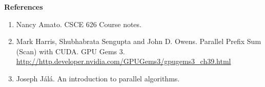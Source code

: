 \documentclass{article}
\theoremstyle{definition}
\begin{document}
\flushleft\textbf{References}
\begin{enumerate}
  \item Nancy Amato. CSCE 626 Course notes.
  \item Mark Harris, Shubhabrata Sengupta and John D. Owens. Parallel Prefix Sum (Scan) with CUDA. GPU Gems 3. \\ \url{http://http.developer.nvidia.com/GPUGems3/gpugems3_ch39.html}
  \item Joseph J\'{a}l\'{a}. An introduction to parallel algorithms.
\end{enumerate}
\end{document}
